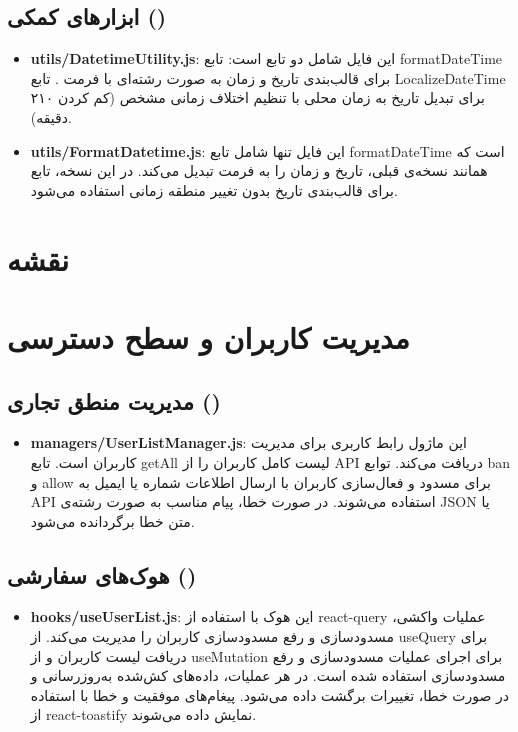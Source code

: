     \subsection{ابزارهای کمکی ()}
    \begin{itemize}
    	\item \textbf{utils/DatetimeUtility.js}:
    	این فایل شامل دو تابع است:
    	تابع formatDateTime برای قالب‌بندی تاریخ و زمان به صورت رشته‌ای با فرمت .
    	تابع LocalizeDateTime برای تبدیل تاریخ به زمان محلی با تنظیم اختلاف زمانی مشخص (کم کردن ۲۱۰ دقیقه).
    	
    	\item \textbf{utils/FormatDatetime.js}:
    	این فایل تنها شامل تابع formatDateTime است که همانند نسخه‌ی قبلی، تاریخ و زمان را به فرمت  تبدیل می‌کند.
    	در این نسخه، تابع برای قالب‌بندی تاریخ بدون تغییر منطقه زمانی استفاده می‌شود.
    	
    	
    \end{itemize}
    
    
    \section{نقشه}
    \section{مدیریت کاربران و سطح دسترسی}
    \subsection{مدیریت منطق تجاری ()}
    \begin{itemize}
    	\item \textbf{managers/UserListManager.js}:
    	این ماژول رابط کاربری برای مدیریت کاربران است.
    	تابع getAll لیست کامل کاربران را از API دریافت می‌کند.
    	توابع ban و allow برای مسدود و فعال‌سازی کاربران با ارسال اطلاعات شماره یا ایمیل به API استفاده می‌شوند.
    	در صورت خطا، پیام مناسب به صورت رشته‌ی JSON یا متن خطا برگردانده می‌شود.
    \end{itemize}
    
    \subsection{هوک‌های سفارشی ()}
    \begin{itemize}
    	\item \textbf{hooks/useUserList.js}:
    	این هوک با استفاده از react-query عملیات واکشی، مسدودسازی و رفع مسدودسازی کاربران را مدیریت می‌کند.
    	از useQuery برای دریافت لیست کاربران و از useMutation برای اجرای عملیات مسدودسازی و رفع مسدودسازی استفاده شده است.
    	در هر عملیات، داده‌های کش‌شده به‌روزرسانی و در صورت خطا، تغییرات برگشت داده می‌شود.
    	پیغام‌های موفقیت و خطا با استفاده از react-toastify نمایش داده می‌شوند.
    \end{itemize}
    
